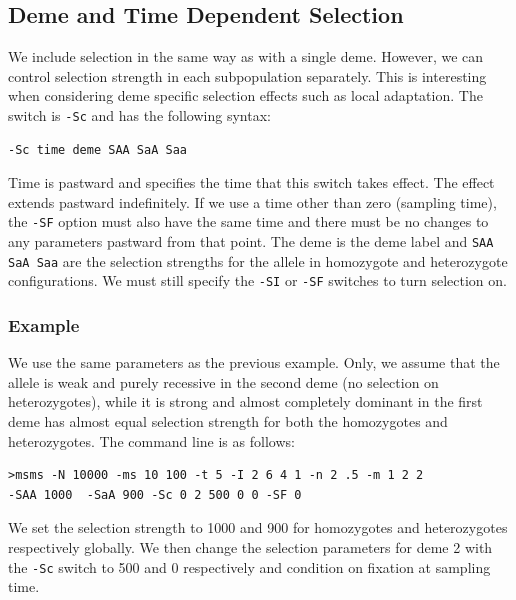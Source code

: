 \documentclass{article}
\begin{document}
\subsection{Deme and Time Dependent Selection}

We include selection in the same way as with a single deme. However, we can
control selection strength in each subpopulation separately. This is interesting
when considering deme specific selection effects such as local adaptation. The
switch is {\tt -Sc} and has the following syntax:
\begin{verbatim}
-Sc time deme SAA SaA Saa
\end{verbatim}
Time is pastward and specifies the time that this switch takes effect. The
effect extends pastward indefinitely. If we use a time other
than zero (sampling time), the {\tt -SF} option must also have the same time and there
must be no changes to any parameters pastward from that point. The deme is the
deme label and {\tt SAA SaA Saa} are the selection strengths for the allele in
homozygote and heterozygote configurations. We must still specify the {\tt -SI}
or {\tt -SF} switches to turn selection on. 
 
\subsubsection{Example}

We use the same parameters as the previous example. Only, we assume that the
allele is weak and purely recessive in the second deme (no selection on
heterozygotes), while it is strong and almost completely dominant in the first
deme has almost equal selection strength for both the homozygotes and
heterozygotes. The command line is as follows:
\begin{verbatim}
>msms -N 10000 -ms 10 100 -t 5 -I 2 6 4 1 -n 2 .5 -m 1 2 2
-SAA 1000  -SaA 900 -Sc 0 2 500 0 0 -SF 0 
\end{verbatim}
We set the selection strength to 1000 and 900 for homozygotes and heterozygotes
respectively globally. We then change the selection parameters for deme 2 with
the {\tt -Sc} switch to 500 and 0 respectively and condition on fixation at
sampling time.  
\end{document}
